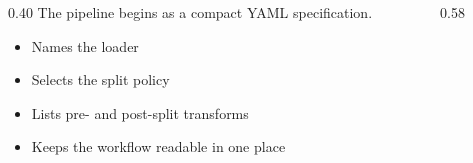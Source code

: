 \begin{frame}

  \vspace{14mm}
  \begin{columns}[T,onlytextwidth]
    \begin{column}{0.40\textwidth}
      {\small The pipeline begins as a compact YAML specification.}\par
      \vspace{1.5mm}
      \begin{itemize}
        \item Names the loader
        \item Selects the split policy
        \item Lists pre- and post-split transforms
        \item Keeps the workflow readable in one place
      \end{itemize}
    \end{column}
    \begin{column}{0.58\textwidth}
      
    \end{column}
  \end{columns}

  \slideheaderfooter
\end{frame}
